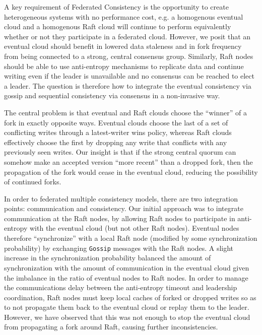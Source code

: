 \documentclass[10pt,conference,compsocconf,letterpaper]{IEEEtran}
\begin{document}
A key requirement of Federated Consistency is the opportunity to create heterogeneous systems with no performance cost, e.g. a homogenous eventual cloud and a homogenous Raft cloud will continue to perform equivalently whether or not they participate in a federated cloud. However, we posit that an eventual cloud should benefit in lowered data staleness and in fork frequency from being connected to a strong, central consensus group. Similarly, Raft nodes should be able to use anti-entropy mechanisms to replicate data and continue writing even if the leader is unavailable and no consensus can be reached to elect a leader. The question is therefore how to integrate the eventual consistency via gossip and sequential consistency via consensus in a non-invasive way.

The central problem is that eventual and Raft clouds choose the ``winner'' of a fork in exactly opposite ways. Eventual clouds choose the last of a set of conflicting writes through a latest-writer wins policy, whereas Raft clouds effectively choose the first by dropping any write that conflicts with any previously seen writes. Our insight is that if the strong central quorum can somehow make an accepted version ``more recent'' than a dropped fork, then the propagation of the fork would cease in the eventual cloud, reducing the possibility of continued forks.

In order to federated multiple consistency models, there are two integration points: communication and consistency. Our initial approach was to integrate communication at the Raft nodes, by allowing Raft nodes to participate in anti-entropy with the eventual cloud (but not other Raft nodes). Eventual nodes therefore ``synchronize'' with a local Raft node (modified by some synchronization probability) by exchanging \texttt{Gossip} messages with the Raft nodes. A slight increase in the synchronization probability balanced the amount of synchronization with the amount of communication in the eventual cloud given the imbalance in the ratio of eventual nodes to Raft nodes. In order to manage the communications delay between the anti-entropy timeout and leadership coordination, Raft nodes must keep local caches of forked or dropped writes so as to not propagate them back to the eventual cloud or replay them to the leader. However, we have observed that this was not enough to stop the eventual cloud from propagating a fork around Raft, causing further inconsistencies.
\end{document}

